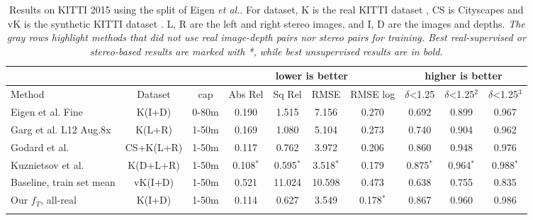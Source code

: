 \documentclass[runningheads]{llncs}
\def\etal{\emph{et al.}\xspace}
\begin{document}
\begin{table}[tb!]
	\begin{center}
		\tiny
		\renewcommand{\arraystretch}{1.6}
		\setlength{\arrayrulewidth}{0.8pt}
		\setlength{\tabcolsep}{0.5pt}
		\caption{Results on KITTI 2015 \cite{Menze2015CVPR} using the split of Eigen \etal \cite{eigen2014depth}. For dataset, K is the real KITTI dataset \cite{Menze2015CVPR}, CS is Cityscapes\cite{Cordts2016Cityscapes} and vK is the synthetic KITTI dataset \cite{gaidon2016virtualworlds}. L, R are the left and right stereo images, and I, D are the images and depths. \emph{The gray rows highlight methods that did not use real image-depth pairs nor stereo pairs for training. Best real-supervised or stereo-based results are marked with *, while best unsupervised results are in bold.}}
		\begin{tabular}{|l|c|c|c|c|c|c|c|c|c|}
			\hline
			\multicolumn{3}{|c|}{} &  \multicolumn{4}{c|}{\cellcolor[rgb]{0.6,0.8,1.0} lower is better} &  \multicolumn{3}{c|}{\cellcolor[rgb]{0.0,0.8,1.0} higher is better} \\
			\hline
			Method & Dataset & cap & \cellcolor[rgb]{0.6,0.8,1.0} {\tiny Abs Rel} & \cellcolor[rgb]{0.6,0.8,1.0} {\tiny Sq Rel} & \cellcolor[rgb]{0.6,0.8,1.0} {\tiny RMSE} & \cellcolor[rgb]{0.6,0.8,1.0} {\tiny RMSE log} & \cellcolor[rgb]{0.0,0.8,1.0} {\tiny $\delta$<1.25} & \cellcolor[rgb]{0.0,0.8,1.0} {\tiny $\delta$<1.25$^2$}  & \cellcolor[rgb]{0.0,0.8,1.0} {\tiny $\delta$<1.25$^3$} \\
			\hline
			Eigen et al.\cite{eigen2014depth} Fine & K(I+D) & 0-80m & 0.190 & 1.515 & 7.156 & 0.270 & 0.692 & 0.899 & 0.967 \\
			\hline 
			Garg et al.\cite{garg2016unsupervised} L12 Aug.8x & K(L+R) & 1-50m & 0.169 & 1.080 & 5.104 & 0.273 & 0.740 & 0.904 & 0.962 \\  
			Godard et al. \cite{godard2017unsupervised} & CS+K(L+R) & 1-50m & 0.117 & 0.762 & 3.972 & 0.206 & 0.860 & 0.948 & 0.976 \\
			Kuznietsov et al. \cite{kuznietsov2017semi} & K(D+L+R) & 1-50m & 0.108$^*$ & 0.595$^*$ & 3.518$^*$ & 0.179 & 0.875$^*$ & 0.964$^*$ & 0.988$^*$ \\
			\hline
			\rowcolor[rgb]{0.9,0.9,0.9}
			Baseline, train set mean &  vK(I+D) & 1-50m & 0.521 & 11.024 & 10.598 & 0.473 & 0.638 & 0.755 & 0.835\\
			\hline
			Our $f_T$, all-real  & K(I+D) & 1-50m & 0.114	& 0.627& 3.549 & 0.178$^*$ & 0.867 & 0.960 & 0.986 \\
			\rowcolor[rgb]{0.9,0.9,0.9}

\end{tabular}
\end{center}
\end{table}
\end{document}
